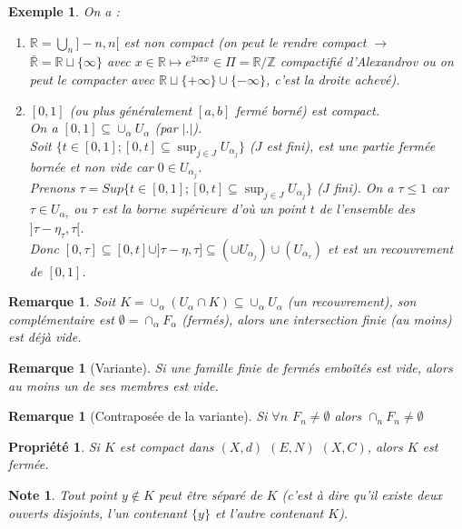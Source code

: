 \documentclass[a4paper, oneside]{report}
\theoremstyle{break}
\newtheorem{propr}[thm]{Propriété}
\newtheorem{exem}[thm]{Exemple}
\newtheorem{remar}[thm]{Remarque}
\newtheorem{note}[thm]{Note}
\newcommand{\R}{\mathbb{R}}
\newcommand{\Z}{\mathbb{Z}}
\begin{document}
\begin{exem}
On a :
\begin{enumerate}
\item $\R = \bigcup_n ]-n,n[$ est non compact (on peut le rendre compact $\rightarrow$ $\bar{\R}=\R\sqcup \{\infty\}$ avec $x\in\R\mapsto e^{2i\pi x}\in \Pi=\R/\Z$ compactifié d'Alexandrov ou on peut le compacter avec $\R \sqcup \{+\infty\} \cup \{-\infty\}$, c'est la droite achevé).\\
\item $[0,1]$ (ou plus généralement $[a,b]$ fermé borné) est compact.\\
On a $[0,1]\subseteq \cup_\alpha U_\alpha$ (par $|.|$).\\
Soit $\{t \in [0,1]; [0,t]\subseteq \sup_{j\in J}U_{\alpha_j} \}$ ($J$ est fini), est une partie fermée bornée et non vide car $0\in U_{\alpha_j}$.\\
Prenons $\tau=Sup\{t\in [0,1]; [0,t]\subseteq  \sup_{j\in J}U_{\alpha_j} \}$ ($J$ fini). On a $\tau \leq 1$ car $\tau \in U_{\alpha_\tau}$ ou $\tau$ est la borne supérieure d'où un point $t$ de l'ensemble des $]\tau - \eta_\tau, \tau[$.\\
Donc $[0,\tau]\subseteq [0,t]\cup ]\tau - \eta, \tau] \subseteq (\cup U_{\alpha_j}) \cup (U_{\alpha_\tau})$ et est un recouvrement de $[0,1]$.
\end{enumerate}
\end{exem}


\begin{remar}
Soit $K = \cup_\alpha (U_\alpha \cap K) \subseteq \cup_\alpha U_\alpha$ (un recouvrement), son complémentaire est $\emptyset = \cap_\alpha F_\alpha$ (fermés), alors une intersection finie (au moins) est déjà vide.
\end{remar}

\begin{remar}[Variante]
Si une famille finie de fermés emboîtés est vide, alors au moins un de ses membres est vide.
\end{remar}

\begin{remar}[Contraposée de la variante]
Si $\forall n$ $F_n\neq \emptyset$ alors $\cap_n F_n \neq \emptyset$
\end{remar}


\begin{propr}
\label{prop_1_b}
Si $K$ est compact dans $(X,d)$ $(E,N)$ $(X,C)$, alors $K$ est fermée.
\end{propr}


\begin{note}
Tout point $y \notin K$ peut être séparé de $K$ (c'est à dire qu'il existe deux ouverts disjoints, l'un contenant $\{y\}$ et l'autre contenant $K$).
\end{note}
\end{document}
